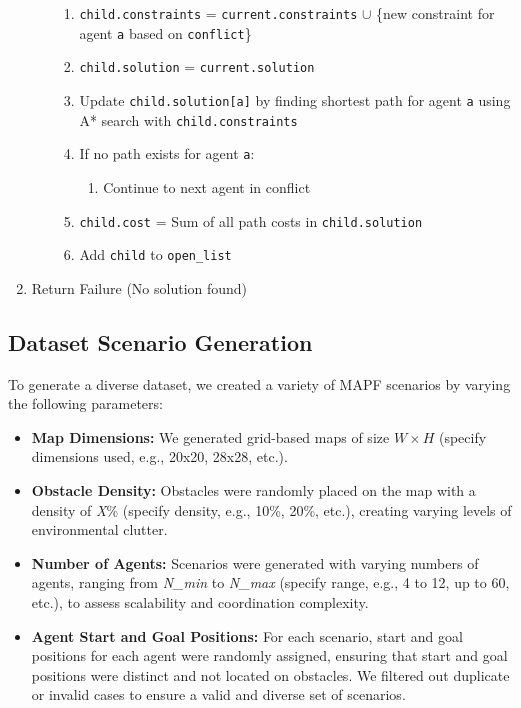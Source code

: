 \begin{algorithm}
\begin{enumerate}
\begin{enumerate}
\begin{enumerate}
                    \item \texttt{child.constraints} = \texttt{current.constraints} $\cup$ \{new constraint for agent \texttt{a} based on \texttt{conflict}\}
                    \item \texttt{child.solution} = \texttt{current.solution}
                    \item Update \texttt{child.solution[a]} by finding shortest path for agent \texttt{a} using A* search with \texttt{child.constraints}
                    \item If no path exists for agent \texttt{a}:
                        \begin{enumerate}
                            \item Continue to next agent in conflict
                        \end{enumerate}
                    \item \texttt{child.cost} = Sum of all path costs in \texttt{child.solution}
                    \item Add \texttt{child} to \texttt{open\_list}
                \end{enumerate}
        \end{enumerate}
    \item Return Failure (No solution found)
\end{enumerate}
\end{algorithm}
\subsection{Dataset Scenario Generation}

To generate a diverse dataset, we created a variety of MAPF scenarios by varying the following parameters:

\begin{itemize}
    \item \textbf{Map Dimensions:} We generated grid-based maps of size $W \times H$ (specify dimensions used, e.g., 20x20, 28x28, etc.).
    \item \textbf{Obstacle Density:} Obstacles were randomly placed on the map with a density of \textit{X}\% (specify density, e.g., 10\%, 20\%, etc.), creating varying levels of environmental clutter.
    \item \textbf{Number of Agents:} Scenarios were generated with varying numbers of agents, ranging from \textit{N\_min} to \textit{N\_max} (specify range, e.g., 4 to 12, up to 60, etc.), to assess scalability and coordination complexity.
    \item \textbf{Agent Start and Goal Positions:} For each scenario, start and goal positions for each agent were randomly assigned, ensuring that start and goal positions were distinct and not located on obstacles. We filtered out duplicate or invalid cases to ensure a valid and diverse set of scenarios.
\end{itemize}

